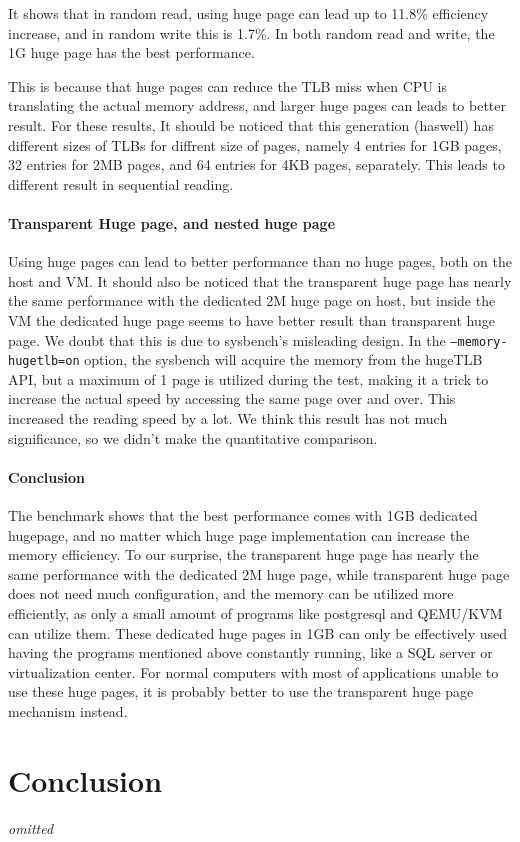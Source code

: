\documentclass[12pt]{article}
\begin{document}
It shows that in random read, using huge page can lead up to 11.8\% efficiency increase, and in random write this is 1.7\%. In both random read and write, the 1G huge page has the best performance.

This is because that huge pages can reduce the TLB miss when CPU is translating the actual memory address, and larger huge pages can leads to better result. For these results, It should be noticed that this generation (haswell) has different sizes of TLBs for diffrent size of pages, namely 4 entries for 1GB pages, 32 entries for 2MB pages, and 64 entries for 4KB pages, separately. This leads to different result in sequential reading.

\paragraph{Transparent Huge page, and nested huge page} Using huge pages can lead to better performance than no huge pages, both on the host and VM. It should also be noticed that the transparent huge page has nearly the same performance with the dedicated 2M huge page on host, but inside the VM the dedicated huge page seems to have better result than transparent huge page. We doubt that this is due to sysbench's misleading design. In the \texttt{--memory-hugetlb=on} option, the sysbench will acquire the memory from the hugeTLB API, but a maximum of 1 page is utilized during the test, making it a trick to increase the actual speed by accessing the same page over and over. This increased the reading speed by a lot. We think this result has not much significance, so we didn't make the quantitative comparison.

\paragraph{Conclusion} The benchmark shows that the best performance comes with 1GB dedicated hugepage, and no matter which huge page implementation can increase the memory efficiency. To our surprise, the transparent huge page has nearly the same performance with the dedicated 2M huge page, while transparent huge page does not need much configuration, and the memory can be utilized more efficiently, as only a small amount of programs like postgresql and QEMU/KVM can utilize them. These dedicated huge pages in 1GB can only be effectively used having the programs mentioned above constantly running, like a SQL server or virtualization center. For normal computers with most of applications unable to use these huge pages, it is probably better to use the transparent huge page mechanism instead.

\section{Conclusion}
\emph{omitted}
\end{document}
